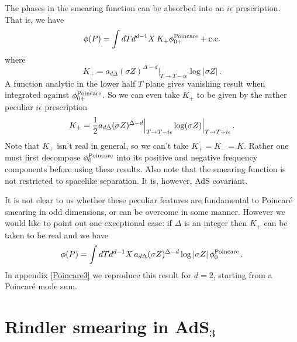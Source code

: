 \documentclass[12pt]{article}
\begin{document}
The phases in the smearing function can be absorbed into an $i \epsilon$ prescription.  That is, we have
\begin{equation}
\phi(P) = \int dT d^{d-1}X \, K_+ \phi_{0+}^{\rm Poincare} + {\rm c.c.}
\end{equation}
where
\begin{equation}
K_+ = a_{d\Delta} (\sigma Z)^{\Delta - d} \Big\vert_{T \rightarrow T - i \epsilon} \log \vert \sigma Z \vert\,.
\end{equation}
A function analytic in the lower half $T$ plane gives vanishing result when integrated against $\phi_{0+}^{\rm Poincare}$.
So we can even take $K_+$ to be given by the rather peculiar $i \epsilon$ prescription
\begin{equation}
\label{PoincareOddSmear}
K_+ = {1 \over 2} a_{d \Delta} (\sigma Z)^{\Delta - d} \Big\vert_{T \rightarrow T - i \epsilon} \log (\sigma Z)
\Big\vert_{T \rightarrow T + i \epsilon}\,.
\end{equation}
Note that $K_+$ isn't real in general, so we can't take $K_+ = K_- = K$.  Rather one must first decompose $\phi_0^{\rm
Poincare}$ into its positive and negative frequency components before using these results.  Also note that the smearing
function is not restricted to spacelike separation.  It is, however, AdS covariant.

It is not clear to us whether these peculiar features are fundamental to Poincar\'e smearing in odd dimensions, or can be
overcome in some manner.  However we would like to point out one exceptional case: if $\Delta$ is an integer then $K_+$
can be taken to be real and we have
\begin{equation}
\label{IntegerDeltaPoincare}
\phi(P) = \int dT d^{d-1}X \, a_{d\Delta} (\sigma Z)^{\Delta - d} \log \vert \sigma Z \vert \,
\phi_{0}^{\rm Poincare}\,.
\end{equation}
In appendix \ref{Poincare3} we reproduce this result for $d=2$, starting from a Poincar\'e mode sum.

\section{Rindler smearing in AdS${}_3$} \label{rads}
\end{document}
